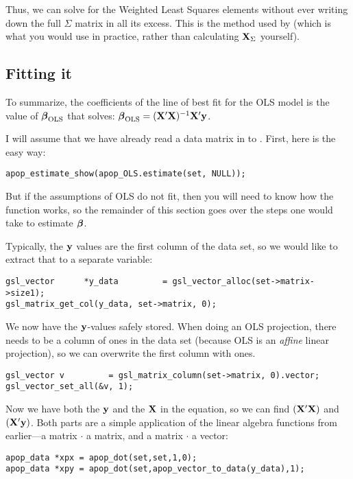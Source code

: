 
Thus, we can solve for the Weighted Least Squares elements without ever
writing down the full $\Sigma$ matrix in all its excess. This is the
method used by  (which is what you would use in
practice, rather than calculating ${\bf X}_\Sigma$ yourself).

\subsection{Fitting it} 
To summarize,
the coefficients of  the line of best fit for the OLS model is the value of ${\mbox{\boldmath$\beta$}}_{\rm OLS}$ that solves:
$ {\mbox{\boldmath$\beta$}}_{\rm OLS} = ({\bf X}'{\bf X})^{-1}{\bf X}'{\bf y}$.

I will assume that we have already read a data matrix in to . First, here is the easy way:
\begin{lstlisting}
apop_estimate_show(apop_OLS.estimate(set, NULL));
\end{lstlisting}
But if the assumptions of OLS do not fit, then you will need to know how
the  function works, so the remainder of this
section goes over the steps one would take to estimate ${\mbox{\boldmath$\beta$}}$.  

Typically, the ${\bf y}$
values are the first column of the data set, so we would like to extract that to a separate variable:
\begin{lstlisting}
gsl_vector      *y_data         = gsl_vector_alloc(set->matrix->size1);
gsl_matrix_get_col(y_data, set->matrix, 0);
\end{lstlisting}

We now have the ${\bf y}$-values safely stored.  When doing an OLS projection,
there needs to be a column of ones in the data set (because OLS is an
{\sl affine} linear projection), so we can overwrite the first column
with ones. 
\begin{lstlisting}
gsl_vector v         = gsl_matrix_column(set->matrix, 0).vector;
gsl_vector_set_all(&v, 1);  
\end{lstlisting}


Now we have both the ${\bf y}$ and the ${\bf X}$ in the equation, so we can find $({\bf X}'{\bf X})$ and $({\bf X}'{\bf y})$.
Both parts are a
simple application of the linear algebra functions from earlier---a matrix $\cdot$ a matrix, and a matrix $\cdot$ a vector:
\begin{lstlisting}
apop_data *xpx = apop_dot(set,set,1,0);
apop_data *xpy = apop_dot(set,apop_vector_to_data(y_data),1);
\end{lstlisting}


